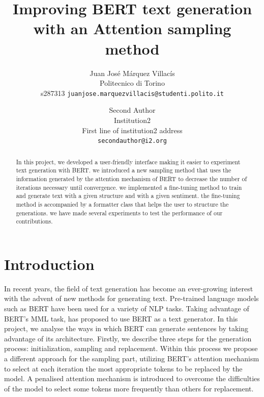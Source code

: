 \documentclass[10pt,twocolumn,letterpaper]{article}
\begin{document}
\title{Improving BERT text generation with an Attention sampling method}

\author{Juan José Márquez Villacís\\
Politecnico di Torino\\
s287313
{\tt\small juanjose.marquezvillacis@studenti.polito.it}
\and
Second Author\\
Institution2\\
First line of institution2 address\\
{\tt\small secondauthor@i2.org}
}

\maketitle

\begin{abstract}
In this project, we developed a user-friendly interface making it easier
to experiment text generation with BERT. we introduced a new sampling method
that uses the information generated by the attention mechanism of BERT to decrease
the number of iterations necessary until convergence. we implemented a fine-tuning
method to train and generate text with a given structure and with a given sentiment.
the fine-tuning method is accompanied by a formatter class that helps the user to
structure the generations. we have made several experiments to test the performance of
our contributions.
\end{abstract}

\section{Introduction}

In recent years, the field of text generation has become an ever-growing interest
with the advent of new methods for generating text. Pre-trained language models
such as BERT have been used for a variety of NLP tasks. Taking advantage of BERT’s
MML task, \cite{wang2019bert} has proposed to use BERT as a text generator. In this project,
we analyse the ways in which BERT can generate sentences by taking advantage of its
architecture. Firstly, we describe three steps for the generation process: initialization,
sampling and replacement. Within this process we propose a different approach for the
sampling part, utilizing BERT’s attention mechanism to select at each iteration the most
appropriate tokens to be replaced by the model. A penalised attention mechanism is
introduced to overcome the difficulties of the model to select some tokens more frequently
than others for replacement.
\end{document}
